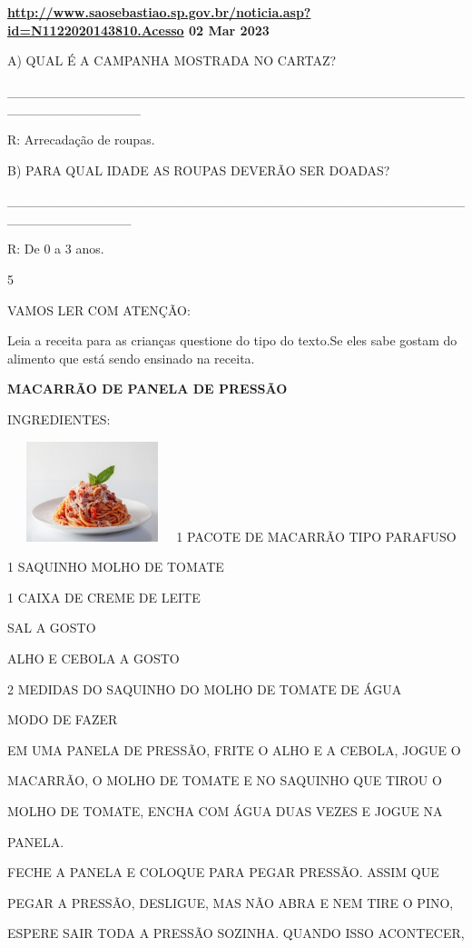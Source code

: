 {{{\textbf{\url{http://www.saosebastiao.sp.gov.br/noticia.asp?id=N1122020143810.Acesso}
02 Mar 2023}

A) QUAL É A CAMPANHA MOSTRADA NO CARTAZ?

\_\_\_\_\_\_\_\_\_\_\_\_\_\_\_\_\_\_\_\_\_\_\_\_\_\_\_\_\_\_\_\_\_\_\_\_\_\_\_\_\_\_\_\_\_\_\_\_\_\_\_\_\_\_\_\_\_\_\_\_\_\_

R: Arrecadação de roupas.

B) PARA QUAL IDADE AS ROUPAS DEVERÃO SER DOADAS?

\_\_\_\_\_\_\_\_\_\_\_\_\_\_\_\_\_\_\_\_\_\_\_\_\_\_\_\_\_\_\_\_\_\_\_\_\_\_\_\_\_\_\_\_\_\_\_\_\_\_\_\_\_\_\_\_\_\_\_\_\_

R: De 0 a 3 anos.

\num{5}

VAMOS LER COM ATENÇÃO:

Leia a receita para as crianças questione do tipo do texto.Se eles sabe
gostam do alimento que está sendo ensinado na receita.

\textbf{MACARRÃO DE PANELA DE PRESSÃO}

INGREDIENTES:

\includegraphics[width=1.94097in,height=1.14722in]{media/image84.jpeg}1
PACOTE DE MACARRÃO TIPO PARAFUSO

1 SAQUINHO MOLHO DE TOMATE

1 CAIXA DE CREME DE LEITE

SAL A GOSTO

ALHO E CEBOLA A GOSTO

2 MEDIDAS DO SAQUINHO DO MOLHO DE TOMATE DE ÁGUA

MODO DE FAZER

EM UMA PANELA DE PRESSÃO, FRITE O ALHO E A CEBOLA, JOGUE O

MACARRÃO, O MOLHO DE TOMATE E NO SAQUINHO QUE TIROU O

MOLHO DE TOMATE, ENCHA COM ÁGUA DUAS VEZES E JOGUE NA

PANELA.

FECHE A PANELA E COLOQUE PARA PEGAR PRESSÃO. ASSIM QUE

PEGAR A PRESSÃO, DESLIGUE, MAS NÃO ABRA E NEM TIRE O PINO,

ESPERE SAIR TODA A PRESSÃO SOZINHA. QUANDO ISSO ACONTECER,

}}}
